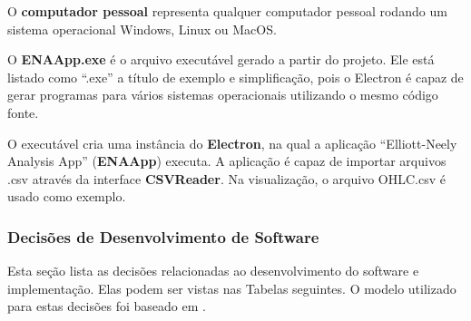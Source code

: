 \documentclass[12pt]{article}
\begin{document}
O \textbf{computador pessoal} representa qualquer computador pessoal rodando um sistema
operacional Windows, Linux ou MacOS.

O \textbf{ENAApp.exe} é o arquivo executável gerado a partir do projeto. Ele está listado
como ``.exe'' a título de exemplo e simplificação, pois o Electron é capaz de gerar programas
para vários sistemas operacionais utilizando o mesmo código fonte.

O executável cria uma instância do \textbf{Electron}, na qual a aplicação ``Elliott-Neely 
Analysis App'' (\textbf{ENAApp}) executa. A aplicação é capaz de importar arquivos .csv
através da interface \textbf{CSVReader}. Na visualização, o arquivo OHLC.csv é usado como
exemplo.

\subsubsection{Decisões de Desenvolvimento de Software}

Esta seção lista as decisões relacionadas ao desenvolvimento do software e implementação.
Elas podem ser vistas nas Tabelas seguintes. O modelo utilizado para estas decisões foi
baseado em \cite{TyreeAckerman:2005}.

\begingroup
\renewcommand*{\arraystretch}{1.2}
\end{document}
